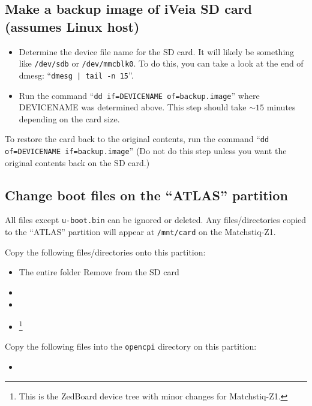 \subsection*{Make a backup image of iVeia SD card (assumes Linux host)}
\begin{itemize}
\item Determine the device file name for the SD card. It will likely be something like \texttt{/dev/sdb} or \texttt{/dev/mmcblk0}. To do this, you can take a look at the end of dmesg: ``\texttt{dmesg | tail -n 15}''.
\item Run the command ``\texttt{dd if=DEVICENAME of=backup.image}'' where DEVICENAME was determined above. This step should take $\sim15$ minutes depending on the card size.
\end{itemize}
\noindent To restore the card back to the original contents, run the command ``\texttt{dd of=DEVICENAME if=backup.image}'' (Do not do this step unless you want the original contents back on the SD card.)
\subsection*{Change boot files on the ``ATLAS'' partition}
All files except \texttt{u-boot.bin} can be ignored or deleted. Any files/directories copied to the ``ATLAS'' partition will appear at \texttt{/mnt/card} on the Matchstiq-Z1.
\begin{itemize}
\begin{minipage}{\linewidth}
\item Copy the following files/directories onto this partition:
\begin{itemize}
\item The entire folder 
\subitem Remove from the SD card 
\item {}
\item {}
\item {}\footnote{This is the ZedBoard device tree with minor changes for Matchstiq-Z1.}
\end{itemize}
\item Copy the following files into the \texttt{opencpi} directory on this partition:
\begin{itemize}
\item {}
\end{itemize}
\end{minipage}
\end{itemize}
\newpage
